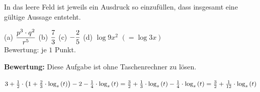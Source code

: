 \documentclass[11pt]{exam}
\begin{document}
\begin{questions}
\question[4]
In das leere Feld ist jeweils ein Ausdruck so einzufüllen, dass insgesamt eine gültige Aussage entsteht.\\[-10pt]
{\begin{solution}
		(a) $\displaystyle\frac{p^3\cdot q^2}{r^5}$ \qquad (b) $\displaystyle\frac{7}{3}$ \qquad (c) $\displaystyle-\frac{2}{5}$ \qquad (d) $\log{9}{x^2}$ $\left(=\log{3}{x}\right)$\\
		Bewertung: je $1$ Punkt.
\end{solution}}
{\vfill}


\newpage
\noaddpoints
\question[\totalpoints]
\addpoints
{\bf Bewertung:} Diese Aufgabe ist ohne Taschenrechner zu lösen.
{\begin{solution}
		$3+\frac{1}{2}\*\left(1+\frac{2}{3}\*\log{s}{t}\right)-2-\frac{1}{4}\*\log{s}{t}=\frac{3}{2}+\frac{1}{3}\*\log{s}{t}-\frac{1}{4}\*\log{s}{t}=\frac{3}{2}+\frac{1}{12}\*\log{s}{t}$
\end{solution}}
{\vfill}
\begin{parts}
	\setcounter{partno}{1}\vspace{5pt}

\end{parts}
\end{questions}
\end{document}
